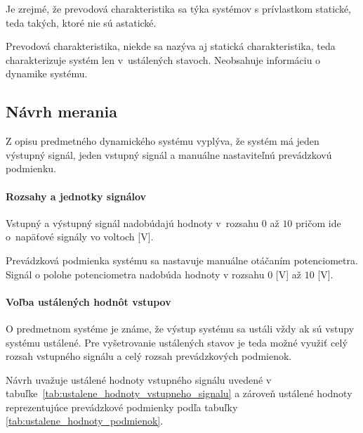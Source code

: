 \documentclass[a4paper, 10pt, ]{article}
\begin{document}
Je zrejmé, že prevodová charakteristika sa týka systémov s prívlastkom statické, teda takých, ktoré nie sú astatické.

Prevodová charakteristika, niekde sa nazýva aj statická charakteristika, teda charakterizuje systém len v~ustálených stavoch. Neobsahuje informáciu o dynamike systému.



\subsection{Návrh merania}

Z opisu predmetného dynamického systému vyplýva, že systém má jeden výstupný signál, jeden vstupný signál a manuálne nastaviteľnú prevádzkovú podmienku.

\paragraph{Rozsahy a jednotky signálov}

Vstupný a výstupný signál nadobúdajú hodnoty v~rozsahu $0$ až $10$ pričom ide o~napäťové signály vo voltoch [V].

Prevádzková podmienka systému sa nastavuje manuálne otáčaním potenciometra. Signál o polohe potenciometra nadobúda hodnoty v rozsahu $0$ [V] až $10$ [V].

\paragraph{Voľba ustálených hodnôt vstupov}

O predmetnom systéme je známe, že výstup systému sa ustáli vždy ak sú vstupy systému ustálené. Pre vyšetrovanie ustálených stavov je teda možné využiť celý rozsah vstupného signálu a celý rozsah prevádzkových podmienok.

Návrh uvažuje ustálené hodnoty vstupného signálu uvedené v tabuľke~\ref{tab:ustalene_hodnoty_vstupneho_signalu} a zároveň ustálené hodnoty reprezentujúce prevádzkové podmienky podľa tabuľky \ref{tab:ustalene_hodnoty_podmienok}.
\end{document}
